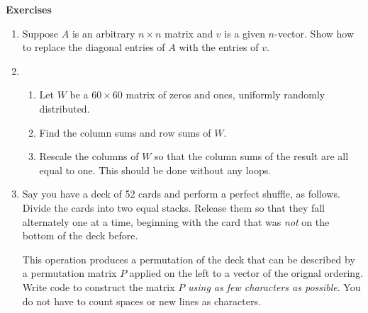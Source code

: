 \documentclass[11pt]{article}
\begin{document}
\begin{center}
  \bf Exercises 
\end{center}

\begin{enumerate}

\item Suppose $A$ is an arbitrary $n\times n$ matrix and $v$ is a
  given $n$-vector. Show how to replace the diagonal entries of $A$
  with the entries of $v$. 

\item
  \begin{enumerate}
  \item Let $W$ be a $60\times 60$ matrix of zeros and ones, uniformly
    randomly distributed.
  \item Find the column sums and row sums of $W$.
  \item Rescale the columns of $W$ so that the column sums of the
    result are all equal to one. This should be done without any
    loops.
  \end{enumerate}


\item 
Say you have a deck of 52 cards and perform a perfect shuffle, as
follows. Divide the cards into two equal stacks. Release them so that
they fall alternately one at a time, beginning with the card that was
\emph{not} on the bottom of the deck before.

This operation produces a permutation of the deck that can be
described by a permutation matrix $P$ applied on the left to a vector
of the orignal ordering. Write code to construct the matrix $P$
\emph{using as few characters as possible}. You do not have to count
spaces or new lines as characters.

\end{enumerate}
\end{document}
